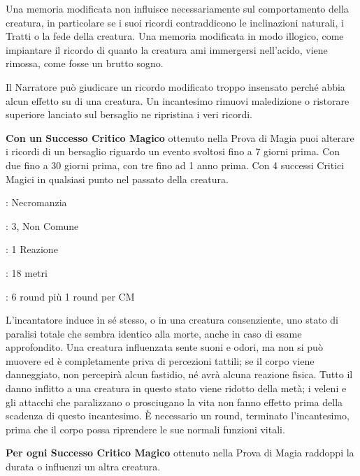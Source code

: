 \begin{multicols}{2}
Una memoria modificata non influisce necessariamente sul comportamento della creatura, in particolare se i suoi ricordi contraddicono le inclinazioni naturali, i Tratti o la fede della creatura. Una memoria modificata in modo illogico, come impiantare il ricordo di quanto la creatura ami immergersi nell'acido, viene rimossa, come fosse un brutto sogno.

Il Narratore può giudicare un ricordo modificato troppo insensato perché abbia alcun effetto su di una creatura. Un incantesimo rimuovi maledizione o ristorare superiore lanciato sul bersaglio ne ripristina i veri ricordi.

\textbf{Con un Successo Critico Magico} ottenuto nella Prova di Magia puoi alterare i ricordi di un bersaglio riguardo un evento svoltosi fino a 7 giorni prima. Con due fino a 30 giorni prima, con tre fino ad 1 anno prima. Con 4 successi Critici Magici in qualsiasi punto nel passato della creatura.

\noindent\colorbox{OBSSgold!10}{
\begin{minipage}{0.95\linewidth}
\begin{description}[noitemsep, topsep=0pt, parsep=0pt, partopsep=0pt, leftmargin=0cm, labelwidth=1.3cm]
	\item[\textbf{Lista}]: Necromanzia
	\item[\textbf{Livello}]: 3, Non Comune
	\item[\textbf{Lancio}]: 1 Reazione
	\item[\textbf{Gittata}]: 18 metri
	\item[\textbf{Durata}]: 6 round più 1 round per CM
\end{description}
\end{minipage}}\smallskip

L'incantatore induce in sé stesso, o in una creatura consenziente, uno stato di paralisi totale che sembra identico alla morte, anche in caso di esame approfondito. Una creatura influenzata sente suoni e odori, ma non si può muovere ed è completamente priva di percezioni tattili; se il corpo viene danneggiato, non percepirà alcun fastidio, né avrà alcuna reazione fisica. Tutto il danno inflitto a una creatura in questo stato viene ridotto della metà; i veleni e gli attacchi che paralizzano o prosciugano la vita non fanno effetto prima della scadenza di questo incantesimo. È necessario un round, terminato l'incantesimo, prima che il corpo possa riprendere le sue normali funzioni vitali.

\textbf{Per ogni Successo Critico Magico} ottenuto nella Prova di Magia raddoppi la durata o influenzi un altra creatura.


\end{multicols}
